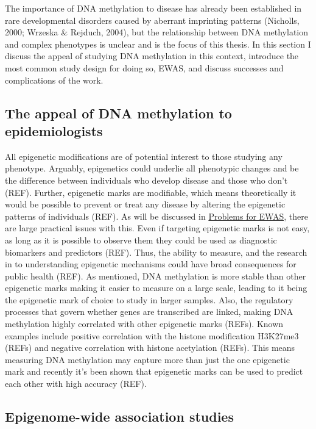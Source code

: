 \documentclass[11pt,twoside]{bristolthesis}
\begin{document}
The importance of DNA methylation to disease has already been established in rare developmental disorders caused by aberrant imprinting patterns (Nicholls, 2000; Wrzeska \& Rejduch, 2004), but the relationship between DNA methylation and complex phenotypes is unclear and is the focus of this thesis. In this section I discuss the appeal of studying DNA methylation in this context, introduce the most common study design for doing so, EWAS, and discuss successes and complications of the work.

\hypertarget{appeal-of-dnam}{%
\subsection{The appeal of DNA methylation to epidemiologists}\label{appeal-of-dnam}}

All epigenetic modifications are of potential interest to those studying any phenotype. Arguably, epigenetics could underlie all phenotypic changes and be the difference between individuals who develop disease and those who don't (REF). Further, epigenetic marks are modifiable, which means theoretically it would be possible to prevent or treat any disease by altering the epigenetic patterns of individuals (REF). As will be discussed in \protect\hyperlink{problems-for-ewas}{Problems for EWAS}, there are large practical issues with this. Even if targeting epigenetic marks is not easy, as long as it is possible to observe them they could be used as diagnostic biomarkers and predictors (REF). Thus, the ability to measure, and the research in to understanding epigenetic mechanisms could have broad consequences for public health (REF). As mentioned, DNA methylation is more stable than other epigenetic marks making it easier to measure on a large scale, leading to it being the epigenetic mark of choice to study in larger samples. Also, the regulatory processes that govern whether genes are transcribed are linked, making DNA methylation highly correlated with other epigenetic marks (REFs). Known examples include positive correlation with the histone modification H3K27me3 (REFs) and negative correlation with histone acetylation (REFs). This means measuring DNA methylation may capture more than just the one epigenetic mark and recently it's been shown that epigenetic marks can be used to predict each other with high accuracy (REF).

\hypertarget{ewas}{%
\subsection{Epigenome-wide association studies}\label{ewas}}
\end{document}
